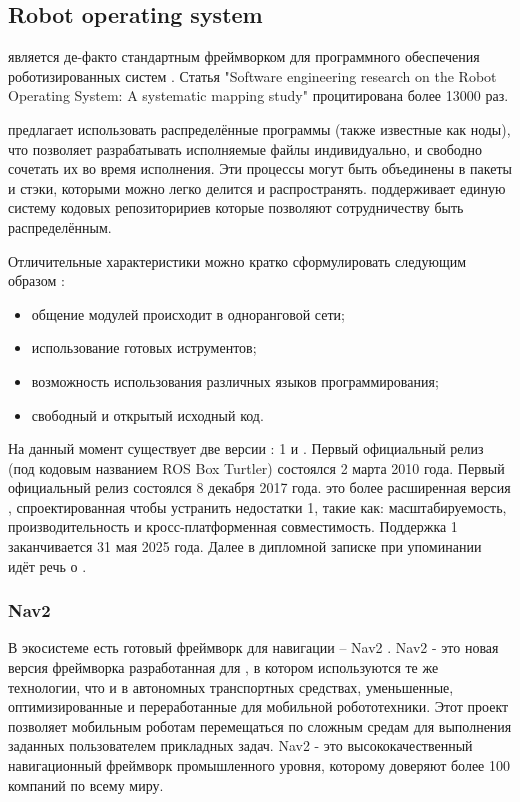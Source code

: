 \subsection{Robot operating system}
\ros{} является де-факто стандартным фреймворком для программного обеспечения
роботизированных систем \cite{albonico2023software}. Статья
"Software engineering research on the Robot Operating System: A systematic
mapping study"
\cite{quigley2009ros} процитирована более \num{13000} раз.

\ros{} предлагает использовать распределённые программы (также известные как
ноды), что позволяет разрабатывать исполняемые файлы индивидуально, и свободно
сочетать их во время исполнения. Эти процессы могут быть объединены в пакеты и
стэки, которыми можно легко делится и распространять.
\ros{} поддерживает единую систему кодовых репозиторириев которые
позволяют сотрудничеству быть распределённым.

Отличительные характеристики \ros{} можно кратко сформулировать следующим образом
 \cite{quigley2009ros}:
\begin{itemize}
	\item общение модулей происходит в одноранговой сети;
	\item использование готовых иструментов;
	\item возможность использования различных языков программирования;
	\item свободный и открытый исходный код.
\end{itemize}

На данный момент существует две версии \ros{}: \ros{}1 и \rosTwo{}. Первый
официальный релиз \ros{} (под кодовым названием ROS Box Turtler) состоялся 2
марта 2010 года. Первый официальный релиз \rosTwo{} состоялся 8 декабря 2017
года. \rosTwo{} это более расширенная версия \ros{}, спроектированная чтобы
устранить недостатки \ros{} 1, такие как: масштабируемость, производительность и
кросс-платформенная совместимость. Поддержка \ros{} 1 заканчивается 31 мая 2025
года. Далее в дипломной записке при упоминании \ros{} идёт речь о \rosTwo{}.


\subsubsection{Nav2}
В экосистеме \ros{} есть готовый фреймворк для навигации -- Nav2
\cite{macenski2020marathon2}. Nav2 - это новая версия фреймворка
разработанная для \rosTwo{}, в котором используются те же технологии, что и в
автономных транспортных средствах, уменьшенные, оптимизированные и
переработанные для мобильной робототехники. Этот проект позволяет мобильным
роботам перемещаться по сложным средам для выполнения заданных пользователем
прикладных задач. Nav2 - это высококачественный навигационный фреймворк
промышленного уровня, которому доверяют более 100 компаний по всему миру.

